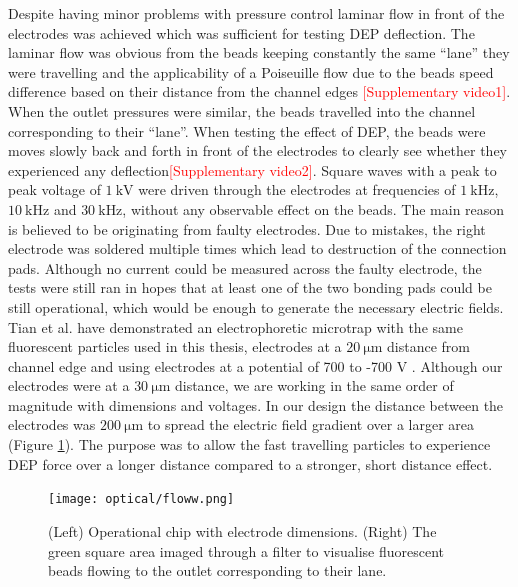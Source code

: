 \documentclass[final]{jyflluk}
\begin{document}
Despite having minor problems with pressure control laminar flow in front of the electrodes was achieved which was sufficient for testing DEP deflection. The laminar flow was obvious from the beads keeping constantly the same “lane” they were travelling and the applicability of a Poiseuille flow due to the beads speed difference based on their distance from the channel edges \textcolor{red}{[Supplementary video1]}. When the outlet pressures were similar, the beads travelled into the channel corresponding to their “lane”. When testing the effect of DEP, the beads were moves slowly back and forth in front of the electrodes to clearly see whether they experienced any deflection\textcolor{red}{[Supplementary video2]}. Square waves with a peak to peak voltage of $\SI{1}{\kilo \volt}$ were driven through the electrodes at frequencies of $\SI{1}{\kilo \Hz}$, $\SI{10}{\kilo \Hz}$ and $\SI{30}{\kilo \Hz}$, without any observable effect on the beads. The main reason is believed to be originating from faulty electrodes. Due to mistakes, the right electrode was soldered multiple times which lead to destruction of the connection pads. Although no current could be measured across the faulty electrode, the tests were still ran in hopes that at least one of the two bonding pads could be still operational, which would be enough to generate the necessary electric fields. Tian et al. have demonstrated an electrophoretic microtrap with the same fluorescent particles used in this thesis, electrodes at a $\SI{20}{\micro \metre}$ distance from channel edge and using electrodes at a potential of  700 to -700 V \cite{tian2018handy}. Although our electrodes were at a $\SI{30}{\micro \metre}$ distance, we are working in the same order of magnitude with dimensions and voltages. In our design the distance between the electrodes was $\SI{200}{\micro \metre}$ to spread the electric field gradient over a larger area (Figure \ref{fig:flow}). The purpose was to allow the fast travelling particles to experience DEP force over a longer distance compared to a stronger, short distance effect.

\begin{figure}[!h]
    \centering
    \texttt{[image: optical/floww.png]}
    \caption{(Left) Operational chip with electrode dimensions. (Right) The green square area imaged through a filter to visualise fluorescent beads flowing to the outlet corresponding to their lane.}
    \label{fig:flow}
\end{figure}
\end{document}
